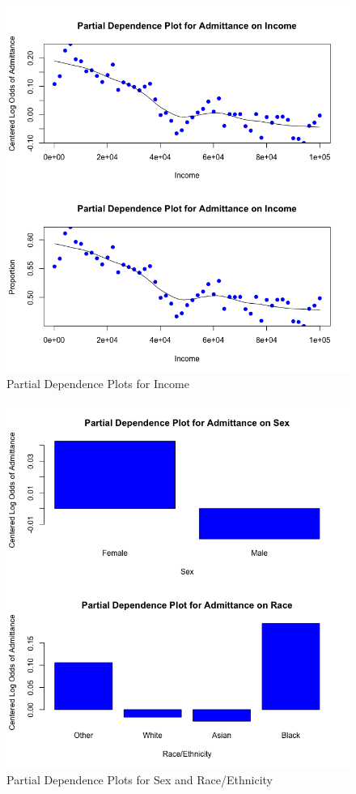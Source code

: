 \documentclass[titlepage]{article}   	%
\begin{document}
\begin{figure} [h]
\centering
\includegraphics[scale=.60]{DEPENDENCE5}
\caption{Partial Dependence Plots for Income}
\end{figure}

\begin{figure} [h]
\centering
\includegraphics[scale=.60]{DEPENDENCE1}
\caption{Partial Dependence Plots for Sex and Race/Ethnicity}
\end{figure}
\end{document}
